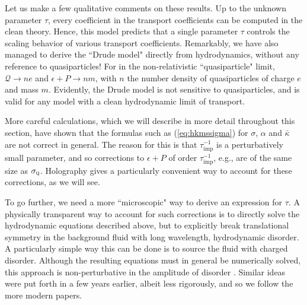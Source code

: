 \documentclass[10pt, oneside]{book}
\begin{document}
\begin{doublespace}
Let us make a few qualitative comments on these results.   Up to the unknown parameter $\tau$,  every coefficient in the transport coefficients can be computed in the clean theory.   Hence, this model predicts that a single parameter $\tau$ controls the scaling behavior of various transport coefficients.   Remarkably, we have also managed to derive the ``Drude model" directly from hydrodynamics, without any reference to quasiparticles!   For in the non-relativistic ``quasiparticle" limit,  $\mathcal{Q} \rightarrow ne$ and $\epsilon+P \rightarrow nm$, with $n$ the number density of quasiparticles of charge $e$ and mass $m$.   Evidently, the Drude model is not sensitive to quasiparticles, and is valid for any model with a clean hydrodynamic limit of transport.

More careful calculations, which we will describe in more detail throughout this section, have shown that the formulas such as (\ref{eq:hkmssigma}) for $\sigma$, $\alpha$ and $\bar\kappa$ are not correct in general.   The reason for this is that $\tau_{\mathrm{imp}}^{-1}$ is a perturbatively small parameter, and so corrections to $\epsilon +P$ of order $\tau_{\mathrm{imp}}^{-1}$, e.g., are of the same size as $\sigma_{\textsc{q}}$.     Holography gives a particularly convenient way to account for these corrections, as we will see.    

To go further,  we need a more ``microscopic" way to derive an expression for $\tau$.   A physically transparent way to account for such corrections is to directly solve the hydrodynamic equations described above, but to explicitly break translational symmetry in the background fluid with long wavelength, hydrodynamic disorder.    A particularly simple way this can be done is to source the fluid with charged disorder.  Although the resulting equations must in general be numerically solved, this approach is non-perturbative in the amplitude of disorder  \cite{Lucas:2015lna, Lucas:2015sya}.  Similar ideas were put forth in \cite{andreev2011} a few years earlier, albeit less rigorously, and so we follow the more modern papers.


\end{doublespace}
\end{document}
